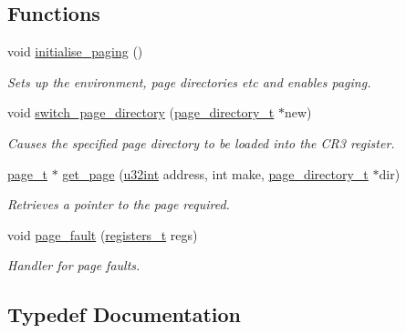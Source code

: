 \subsection*{Functions}
\begin{DoxyCompactItemize}
\item 
void \hyperlink{a00101_ad05c453b13c69ecf5c7963798704cc18_ad05c453b13c69ecf5c7963798704cc18}{initialise\+\_\+paging} ()
\begin{DoxyCompactList}\small\item\em Sets up the environment, page directories etc and enables paging. \end{DoxyCompactList}\item 
void \hyperlink{a00101_af364044d82ac10c64dc653f8e3620dba_af364044d82ac10c64dc653f8e3620dba}{switch\+\_\+page\+\_\+directory} (\hyperlink{a00101_aa6e79064ffe1eb8c43be4dc1be3f64a1_aa6e79064ffe1eb8c43be4dc1be3f64a1}{page\+\_\+directory\+\_\+t} $\ast$new)
\begin{DoxyCompactList}\small\item\em Causes the specified page directory to be loaded into the C\+R3 register. \end{DoxyCompactList}\item 
\hyperlink{a00101_a76113662e059e0926a92c5b15c098f4a_a76113662e059e0926a92c5b15c098f4a}{page\+\_\+t} $\ast$ \hyperlink{a00101_ab80db06fa94f1003fd5a5ec106bc9f6e_ab80db06fa94f1003fd5a5ec106bc9f6e}{get\+\_\+page} (\hyperlink{a00116_a7ae3a26c17ddfe117c6291739780801d_a7ae3a26c17ddfe117c6291739780801d}{u32int} address, int make, \hyperlink{a00101_aa6e79064ffe1eb8c43be4dc1be3f64a1_aa6e79064ffe1eb8c43be4dc1be3f64a1}{page\+\_\+directory\+\_\+t} $\ast$dir)
\begin{DoxyCompactList}\small\item\em Retrieves a pointer to the page required. \end{DoxyCompactList}\item 
void \hyperlink{a00101_a6293af8e675059a566216be86660854b_a6293af8e675059a566216be86660854b}{page\+\_\+fault} (\hyperlink{a00095_adf58dbaf6139b4957c348711f2026957_adf58dbaf6139b4957c348711f2026957}{registers\+\_\+t} regs)
\begin{DoxyCompactList}\small\item\em Handler for page faults. \end{DoxyCompactList}\end{DoxyCompactItemize}


\subsection{Typedef Documentation}
\mbox{\label{a00101_aa6e79064ffe1eb8c43be4dc1be3f64a1_aa6e79064ffe1eb8c43be4dc1be3f64a1}} 
